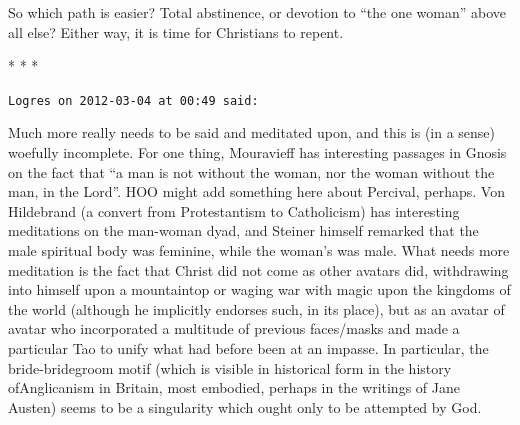 So which path is easier? Total abstinence, or devotion to ``the one woman'' above all else? Either way, it is time for Christians to repent.



\begin{center}* * *\end{center}

\begin{footnotesize}
\begin{sffamily}
\texttt{Logres on 2012-03-04 at 00:49 said:}

Much more really needs to be said and meditated upon, and this is (in a sense) woefully incomplete. For one thing, Mouravieff has interesting passages in Gnosis on the fact that ``a man is not without the woman, nor the woman without the man, in the Lord''. HOO might add something here about Percival, perhaps. Von Hildebrand (a convert from Protestantism to Catholicism) has interesting meditations on the man-woman dyad, and Steiner himself remarked that the male spiritual body was feminine, while the woman's was male. What needs more meditation is the fact that Christ did not come as other avatars did, withdrawing into himself upon a mountaintop or waging war with magic upon the kingdoms of the world (although he implicitly endorses such, in its place), but as an avatar of avatar who incorporated a multitude of previous faces/masks and made a particular Tao to unify what had before been at an impasse. In particular, the bride-bridegroom motif (which is visible in historical form in the history ofAnglicanism in Britain, most embodied, perhaps in the writings of Jane Austen) seems to be a singularity which ought only to be attempted by God.

\hfill

\end{sffamily}
\end{footnotesize}

